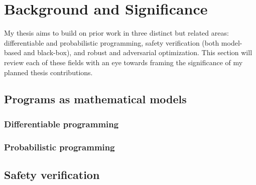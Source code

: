 
\section{Background and Significance}


My thesis aims to build on prior work in three distinct but related areas: differentiable and probabilistic programming, 
safety verification (both model-based and black-box), and robust and adversarial optimization. This section will review each of these fields with an eye towards framing the significance of my planned thesis contributions.

\subsection{Programs as mathematical models}



\subsubsection{Differentiable programming}





\subsubsection{Probabilistic programming}





\subsection{Safety verification}


